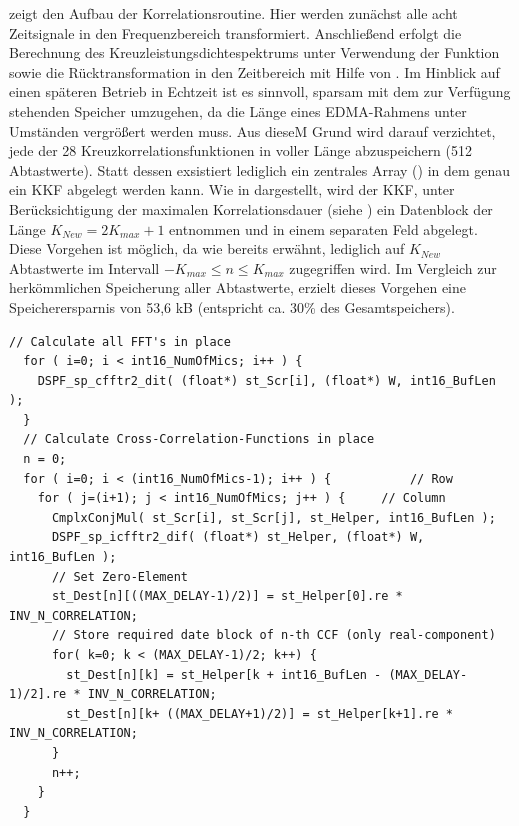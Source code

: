  zeigt den Aufbau der Korrelationsroutine. Hier werden zunächst alle acht Zeitsignale in den Frequenzbereich transformiert. Anschließend erfolgt die Berechnung des Kreuzleistungsdichtespektrums unter Verwendung der Funktion  sowie die Rücktransformation in den Zeitbereich mit Hilfe von . Im Hinblick auf einen späteren Betrieb in Echtzeit ist es sinnvoll, sparsam mit dem zur Verfügung stehenden Speicher umzugehen, da die Länge eines EDMA-Rahmens unter Umständen vergrößert werden muss. Aus dieseM Grund wird darauf verzichtet, jede der 28 Kreuzkorrelationsfunktionen in voller Länge  abzuspeichern (512 Abtastwerte). Statt dessen exsistiert lediglich ein zentrales Array () in dem genau ein KKF abgelegt werden kann. Wie in  dargestellt, wird der KKF, unter Berücksichtigung der maximalen Korrelationsdauer (siehe ) ein Datenblock der Länge $K_{New} = 2K_{max} + 1$ entnommen und in einem separaten Feld abgelegt. Diese Vorgehen ist möglich, da wie bereits erwähnt, lediglich auf $K_{New}$ Abtastwerte im Intervall $-K_{max} \leq n \leq K_{max}$ zugegriffen wird. Im Vergleich zur herkömmlichen Speicherung aller Abtastwerte, erzielt dieses Vorgehen eine Speicherersparnis von 53,6 kB (entspricht ca. 30\% des Gesamtspeichers).

\pagebreak

\begin{lstlisting}[caption={Berechnung der Kreuzkorrelationsfunktionen}, label=lst:fcc,frame=htlrb, firstnumber=1]
  // Calculate all FFT's in place
  for ( i=0; i < int16_NumOfMics; i++ ) {
    DSPF_sp_cfftr2_dit( (float*) st_Scr[i], (float*) W, int16_BufLen );
  }
  // Calculate Cross-Correlation-Functions in place
  n = 0;
  for ( i=0; i < (int16_NumOfMics-1); i++ ) {			// Row
    for ( j=(i+1); j < int16_NumOfMics; j++ ) {		// Column  
      CmplxConjMul( st_Scr[i], st_Scr[j], st_Helper, int16_BufLen );
      DSPF_sp_icfftr2_dif( (float*) st_Helper, (float*) W, int16_BufLen );
      // Set Zero-Element
      st_Dest[n][((MAX_DELAY-1)/2)] = st_Helper[0].re * INV_N_CORRELATION;
      // Store required date block of n-th CCF (only real-component)
      for( k=0; k < (MAX_DELAY-1)/2; k++) {
        st_Dest[n][k] = st_Helper[k + int16_BufLen - (MAX_DELAY-1)/2].re * INV_N_CORRELATION;
        st_Dest[n][k+ ((MAX_DELAY+1)/2)] = st_Helper[k+1].re * INV_N_CORRELATION;
      }
      n++;
    }
  }
\end{lstlisting}


